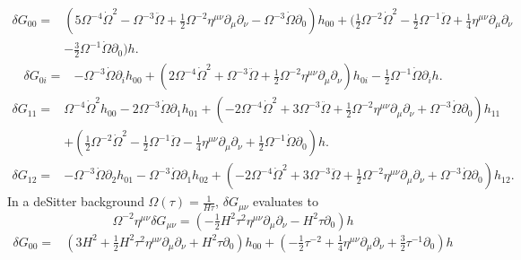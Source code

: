\documentclass[10pt,letterpaper]{article}
\begin{document}
\begin{align}
\delta G_{00}={}&(5 \Omega^{-4} \dot{\Omega}^2
 -  \Omega^{-3} \ddot{\Omega}
 + \tfrac{1}{2} \Omega^{-2} \eta^{\mu \nu} \partial_{\mu} \partial_{\nu}
 -  \Omega^{-3} \dot{\Omega} \partial_{0}) h_{00}
 + (\tfrac{1}{2} \Omega^{-2} \dot{\Omega}^2
 -  \tfrac{1}{2} \Omega^{-1} \ddot{\Omega}
 + \tfrac{1}{4} \eta^{\mu \nu} \partial_{\mu} \partial_{\nu}\nonumber\\
& -  \tfrac{3}{2} \Omega^{-1} \dot{\Omega} \partial_{0}) h.
\end{align}
\begin{align}
\delta G_{0i}={}&- \Omega^{-3} \dot{\Omega} \partial_{i} h_{00}
 + (2 \Omega^{-4} \dot{\Omega}^2
 + \Omega^{-3} \ddot{\Omega}
 + \tfrac{1}{2} \Omega^{-2} \eta^{\mu \nu} \partial_{\mu} \partial_{\nu}) h_{0i}
 -  \tfrac{1}{2} \Omega^{-1} \dot{\Omega} \partial_{i} h.
\end{align}
\begin{align}
\delta G_{11}={}&\Omega^{-4} \dot{\Omega}^2 h_{00}
 - 2 \Omega^{-3} \dot{\Omega} \partial_{1} h_{01}
 + (-2 \Omega^{-4} \dot{\Omega}^2
 + 3 \Omega^{-3} \ddot{\Omega}
 + \tfrac{1}{2} \Omega^{-2} \eta^{\mu \nu} \partial_{\mu} \partial_{\nu}
 + \Omega^{-3} \dot{\Omega} \partial_{0}) h_{11}\nonumber\\
& + (\tfrac{1}{2} \Omega^{-2} \dot{\Omega}^2
 -  \tfrac{1}{2} \Omega^{-1} \ddot{\Omega}
 -  \tfrac{1}{4} \eta^{\mu \nu} \partial_{\mu} \partial_{\nu}
 + \tfrac{1}{2} \Omega^{-1} \dot{\Omega} \partial_{0}) h.
\end{align}
\begin{align}
\delta G_{12}={}&- \Omega^{-3} \dot{\Omega} \partial_{2} h_{01}
 -  \Omega^{-3} \dot{\Omega} \partial_{1} h_{02}
 + (-2 \Omega^{-4} \dot{\Omega}^2
 + 3 \Omega^{-3} \ddot{\Omega}
 + \tfrac{1}{2} \Omega^{-2} \eta^{\mu \nu} \partial_{\mu} \partial_{\nu}
 + \Omega^{-3} \dot{\Omega} \partial_{0}) h_{12}.
\end{align}
In a deSitter background $\Omega(\tau) = \frac{1}{H\tau}$, $\delta G_{\mu\nu}$ evaluates to
\begin{equation}
	\Omega^{-2}\eta^{\mu\nu}\delta G_{\mu\nu}
=(- \tfrac{1}{2} H^2 \tau^2 \eta^{\mu \nu} \partial_{\mu} \partial_{\nu} -  H^2 \tau \partial_{0}) h
\end{equation}
\begin{align}
\delta G_{00}={}&(3 H^2
 + \tfrac{1}{2} H^2 \tau^2 \eta^{\mu \nu} \partial_{\mu} \partial_{\nu}
 + H^2 \tau \partial_{0}) h_{00}
 + (- \tfrac{1}{2} \tau^{-2}
 + \tfrac{1}{4} \eta^{\mu \nu} \partial_{\mu} \partial_{\nu}
 + \tfrac{3}{2} \tau^{-1} \partial_{0}) h
\end{align}
\end{document}
